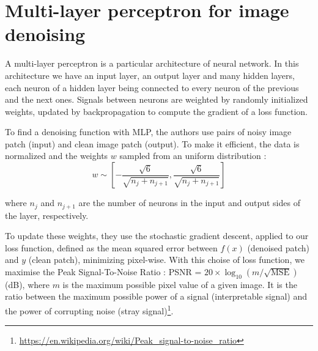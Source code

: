 \documentclass[10pt,a4paper]{article}
\newcommand{\svs}{\vspace{9pt}}
\begin{document}





\section{Multi-layer perceptron for image denoising}

A multi-layer perceptron is a particular architecture of neural network. In this architecture we have an input layer, an output layer and many hidden layers, each neuron of a hidden layer being connected to every neuron of the previous and the next ones. Signals between neurons are weighted by randomly initialized weights, updated by backpropagation to compute the gradient of a loss function.

\svs

To find a denoising function with MLP, the authors use pairs of noisy image patch (input) and clean image patch (output). To make it efficient, the data is normalized and the weights $w$ sampled from an uniform distribution :  \\%
$$w \sim \left[-\frac{\sqrt{6}}{\sqrt{n_j + n_{j+1}}}, \frac{\sqrt{6}}{\sqrt{n_j + n_{j+1}}}\right]$$ 

\svs
where $n_j$ and $n_{j+1}$ are the number of neurons in the input and output sides of the layer, respectively.

\svs

To update these weights, they use the stochastic gradient descent, applied to our loss function, defined as the mean squared error between $f(x)$ (denoised patch) and $y$ (clean patch), minimizing pixel-wise. With this choise of loss function, we maximise the Peak Signal-To-Noise Ratio : PSNR = $20 \times \log_{10}(m/\sqrt{\mathrm{MSE}})$ (dB), where $m$ is the maximum possible pixel value of a given image. It is the ratio between the maximum possible power of a signal (interpretable signal) and the power of corrupting noise (stray signal)\footnote{\href{https://en.wikipedia.org/wiki/Peak\_signal-to-noise\_ratio}{https://en.wikipedia.org/wiki/Peak\_signal-to-noise\_ratio}}.
\end{document}
